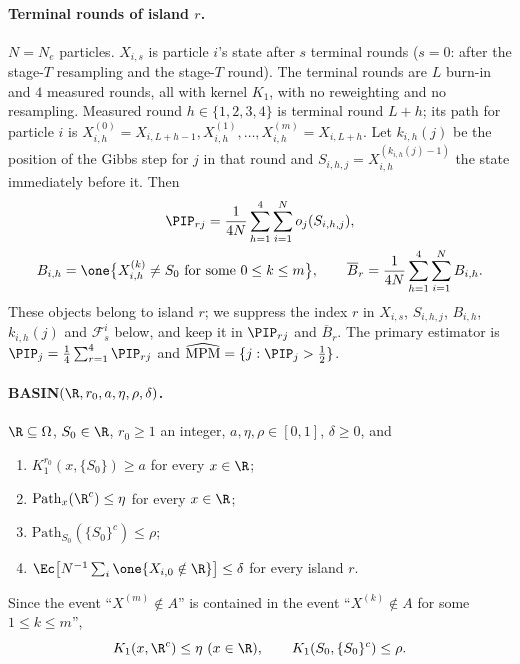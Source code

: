 \documentclass[11pt]{report}
\begin{document}
\paragraph{Terminal rounds of island $r$.} $N=N_e$ particles. $X_{i,s}$ is particle $i$'s state after $s$ terminal rounds ($s=0$: after the stage-$T$ resampling and the stage-$T$ round). The terminal rounds are $L$ burn-in and $4$ measured rounds, all with kernel $K_1$, with no reweighting and no resampling. Measured round $h\in\{1,2,3,4\}$ is terminal round $L+h$; its path for particle $i$ is $X^{(0)}_{i,h}=X_{i,L+h-1},X^{(1)}_{i,h},\dots,X^{(m)}_{i,h}=X_{i,L+h}$. Let $k_{i,h}(j)$ be the position of the Gibbs step for $j$ in that round and $S_{i,h,j}=X^{(k_{i,h}(j)-1)}_{i,h}$ the state immediately before it. Then
\begin{gather*}
\PIP_{rj}=\frac1{4N}\sum_{h=1}^4\sum_{i=1}^N o_j(S_{i,h,j}),\\
B_{i,h}=\one\bigl\{X^{(k)}_{i,h}\neq S_0\text{ for some }0\le k\le m\bigr\},\qquad
\overline B_r=\frac1{4N}\sum_{h=1}^4\sum_{i=1}^N B_{i,h}.
\end{gather*}
These objects belong to island $r$; we suppress the index $r$ in $X_{i,s}$, $S_{i,h,j}$, $B_{i,h}$, $k_{i,h}(j)$ and $\mathcal F^i_s$ below, and keep it in $\PIP_{rj}$ and $\overline B_r$. The primary estimator is $\PIP_j=\tfrac14\sum_{r=1}^4\PIP_{rj}$ and $\widehat{\mathrm{MPM}}=\{j:\PIP_j>\tfrac12\}$.

\paragraph{BASIN$(\R,r_0,a,\eta,\rho,\delta)$.} $\R\subseteq\Omega$, $S_0\in\R$, $r_0\ge1$ an integer, $a,\eta,\rho\in[0,1]$, $\delta\ge0$, and
\begin{enumerate}[label=(B\arabic*)]
\item $K_1^{r_0}(x,\{S_0\})\ge a$ for every $x\in\R$;
\item $\mathrm{Path}_x(\R^c)\le\eta$ for every $x\in\R$;
\item $\mathrm{Path}_{S_0}(\{S_0\}^c)\le\rho$;
\item $\Ec\bigl[N^{-1}\sum_{i}\one\{X_{i,0}\notin\R\}\bigr]\le\delta$ for every island $r$.
\end{enumerate}
Since the event ``$X^{(m)}\notin A$'' is contained in the event ``$X^{(k)}\notin A$ for some $1\le k\le m$'',
\begin{equation}\label{T23:eq:endpoint}
K_1(x,\R^c)\le\eta\ (x\in\R),\qquad K_1(S_0,\{S_0\}^c)\le\rho .
\end{equation}
\end{document}
